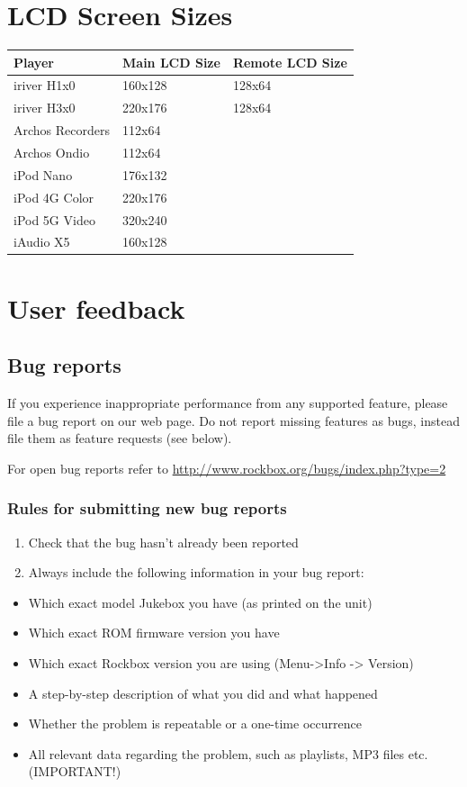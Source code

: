 \chapter{LCD Screen Sizes}
\begin{center}
  \begin{tabular}{@{}lll@{}}\toprule
    \textbf{Player} & \textbf{Main LCD Size} & \textbf{Remote LCD Size}\\\midrule
    iriver H1x0 & 160x128 & 128x64\\
    iriver H3x0 & 220x176 & 128x64\\
    Archos Recorders & 112x64 & \\ 
    Archos Ondio & 112x64 & \\
    iPod Nano & 176x132 & \\
    iPod 4G Color & 220x176 & \\
    iPod 5G Video & 320x240 & \\
    iAudio X5 & 160x128 & \\\bottomrule
  \end{tabular}
\end{center}


\chapter{User feedback}
\section{Bug reports}
If you experience inappropriate performance from any supported feature,
please file a bug report on our web page. Do not report missing
features as bugs, instead file them as feature requests (see below).

For open bug reports refer to
\url{http://www.rockbox.org/bugs/index.php?type=2}

\subsection{Rules for submitting new bug reports}

\begin{enumerate}
\item  Check that the bug hasn't already been reported
\item  Always include the following information in your bug report:
\end{enumerate}

\begin{itemize}
\item  Which exact model Jukebox you have (as printed on the unit)
\item  Which exact ROM firmware version you have
\item  Which exact Rockbox version you are using
(Menu{}-{\textgreater}Info {}-{\textgreater} Version)
\item  A step{}-by{}-step description of what you did and what happened
\item  Whether the problem is repeatable or a one{}-time occurrence
\item  All relevant data regarding the problem, such as playlists, MP3
files etc. (IMPORTANT!) 
\end{itemize}

